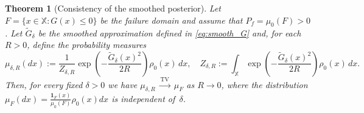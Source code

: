 \documentclass[a4paper]{article}
\numberwithin{equation}{section}
\newtheorem{theorem}{Theorem}[section]
\begin{document}
\begin{theorem}[Consistency of the smoothed posterior]
\label{thm:consistency}
Let $F=\{x\in\mathbb X : G(x)\le 0\}$ be the failure domain and assume that $P_f=\mu_0(F)>0$. Let $\tilde G_\delta$ be the smoothed approximation defined in
\eqref{eq:smooth_G} and, for each $R>0$, define the probability measures
\begin{equation}\label{eq:smoothedpost}
  \mu_{\delta,R}(dx)
  := \frac{1}{Z_{\delta,R}}
     \exp\!\left(-\frac{\tilde G_\delta(x)^2}{2R}\right)\rho_0(x)\,dx,
  \quad  
  Z_{\delta,R}
  := \int_{\mathbb X} \exp\!\left(-\frac{\tilde G_\delta(x)^2}{2R}\right)
      \rho_0(x)\,dx.
\end{equation}
Then, for every fixed $\delta>0$ we have $\mu_{\delta,R}\;\xrightarrow{\mathrm{TV}}\;\mu_F$ as $R\rightarrow 0 $,
where the distribution $\mu_F(dx)=\frac{\mathbf{1}_F(x)}{\mu_0(F)}\rho_0(x)dx$ is independent of~$\delta$. 
\end{theorem}
\end{document}
